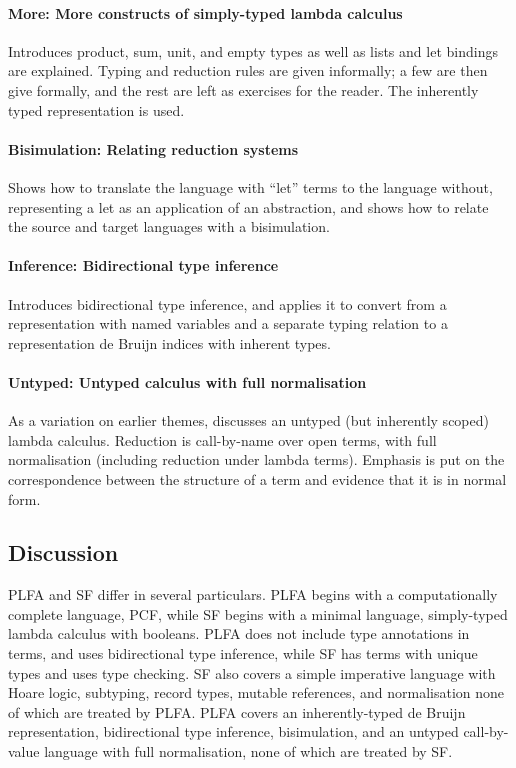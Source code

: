 \documentclass[runningheads]{llncs}
\begin{document}
\paragraph{More: More constructs of simply-typed lambda calculus}
Introduces product, sum, unit, and empty types as well as lists and let bindings
are explained.  Typing and reduction rules are given informally; a few
are then give formally, and the rest are left as exercises for the reader.
The inherently typed representation is used.

\paragraph{Bisimulation: Relating reduction systems}
Shows how to translate the language with ``let'' terms
to the language without, representing a let as an application of an abstraction,
and shows how to relate the source and target languages with a bisimulation.

\paragraph{Inference: Bidirectional type inference}
Introduces bidirectional type inference, and applies it to convert from
a representation with named variables and a separate typing relation
to a representation de Bruijn indices with inherent types. 

\paragraph{Untyped: Untyped calculus with full normalisation}
As a variation on earlier themes, discusses an untyped (but inherently
scoped) lambda calculus.  Reduction is call-by-name over open terms,
with full normalisation (including reduction under lambda terms).  Emphasis
is put on the correspondence between the structure of a term and
evidence that it is in normal form.

\subsection*{Discussion}

PLFA and SF differ in several particulars.  PLFA begins with a computationally
complete language, PCF, while SF begins with a minimal language, simply-typed
lambda calculus with booleans.  PLFA does not include type annotations in terms,
and uses bidirectional type inference, while SF has terms with unique types and
uses type checking.  SF also covers a simple imperative language with Hoare logic,
subtyping, record types, mutable references, and normalisation none of which are
treated by PLFA.  PLFA covers an inherently-typed de Bruijn
representation, bidirectional type inference, bisimulation, and an
untyped call-by-value language with full normalisation, none of which
are treated by SF.
\end{document}
